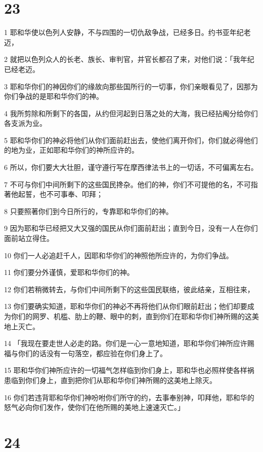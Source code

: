 \chapter{23}

\par 1 耶和华使以色列人安静，不与四围的一切仇敌争战，已经多日。约书亚年纪老迈，
\par 2 就把以色列众人的长老、族长、审判官，并官长都召了来，对他们说：「我年纪已经老迈。
\par 3 耶和华你们的神因你们的缘故向那些国所行的一切事，你们亲眼看见了，因那为你们争战的是耶和华你们的神。
\par 4 我所剪除和所剩下的各国，从约但河起到日落之处的大海，我已经拈阄分给你们各支派为业。
\par 5 耶和华你们的神必将他们从你们面前赶出去，使他们离开你们，你们就必得他们的地为业，正如耶和华你们的神所应许的。
\par 6 所以，你们要大大壮胆，谨守遵行写在摩西律法书上的一切话，不可偏离左右。
\par 7 不可与你们中间所剩下的这些国民搀杂。他们的神，你们不可提他的名，不可指著他起誓，也不可事奉、叩拜；
\par 8 只要照著你们到今日所行的，专靠耶和华你们的神。
\par 9 因为耶和华已经把又大又强的国民从你们面前赶出；直到今日，没有一人在你们面前站立得住。
\par 10 你们一人必追赶千人，因耶和华你们的神照他所应许的，为你们争战。
\par 11 你们要分外谨慎，爱耶和华你们的神。
\par 12 你们若稍微转去，与你们中间所剩下的这些国民联络，彼此结亲，互相往来，
\par 13 你们要确实知道，耶和华你们的神必不再将他们从你们眼前赶出；他们却要成为你们的网罗、机槛、肋上的鞭、眼中的刺，直到你们在耶和华你们神所赐的这美地上灭亡。
\par 14 「我现在要走世人必走的路。你们是一心一意地知道，耶和华你们神所应许赐福与你们的话没有一句落空，都应验在你们身上了。
\par 15 耶和华你们神所应许的一切福气怎样临到你们身上，耶和华也必照样使各样祸患临到你们身上，直到把你们从耶和华你们神所赐的这美地上除灭。
\par 16 你们若违背耶和华你们神吩咐你们所守的约，去事奉别神，叩拜他，耶和华的怒气必向你们发作，使你们在他所赐的美地上速速灭亡。」

\chapter{24}

